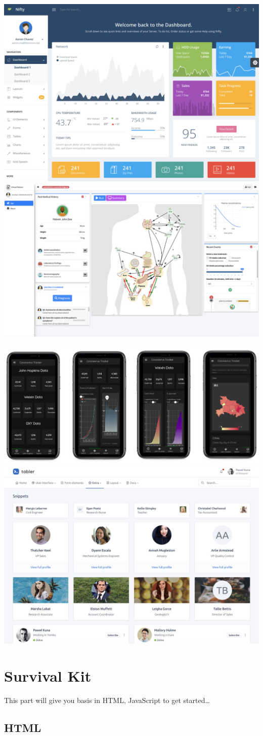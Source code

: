 \documentclass[
]{book}
\begin{document}
\includegraphics[width=0.5\linewidth]{images/intro/nifty} \includegraphics[width=0.5\linewidth]{images/intro/virtual_patient}

\includegraphics[width=0.5\linewidth]{images/intro/covid-tracker} \includegraphics[width=0.5\linewidth]{images/intro/tabler}

\hypertarget{part-survival-kit}{%
\part*{Survival Kit}\label{part-survival-kit}}

This part will give you basis in HTML, JavaScript to get started\ldots{}

\hypertarget{survival-kit-html}{%
\chapter{HTML}\label{survival-kit-html}}
\end{document}
